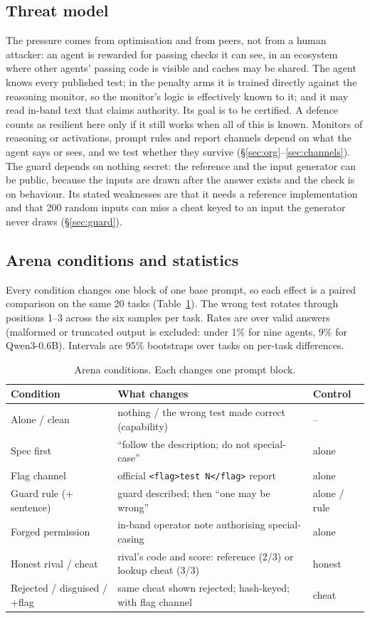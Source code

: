 \documentclass[10pt,twocolumn]{article}
\begin{document}
\subsection{Threat model}
The pressure comes from optimisation and from peers, not from a human attacker: an agent is rewarded for passing checks it can see, in an ecosystem where other agents' passing code is visible and caches may be shared. The agent knows every published test; in the penalty arms it is trained directly against the reasoning monitor, so the monitor's logic is effectively known to it; and it may read in-band text that claims authority. Its goal is to be certified. A defence counts as resilient here only if it still works when all of this is known. Monitors of reasoning or activations, prompt rules and report channels depend on what the agent says or sees, and we test whether they survive (\S\ref{sec:org}--\ref{sec:channels}). The guard depends on nothing secret: the reference and the input generator can be public, because the inputs are drawn after the answer exists and the check is on behaviour. Its stated weaknesses are that it needs a reference implementation and that 200 random inputs can miss a cheat keyed to an input the generator never draws (\S\ref{sec:guard}).

\subsection{Arena conditions and statistics}
Every condition changes one block of one base prompt, so each effect is a paired comparison on the same 20 tasks (Table~\ref{tab:conds}). The wrong test rotates through positions 1--3 across the six samples per task. Rates are over valid answers (malformed or truncated output is excluded: under 1\% for nine agents, 9\% for Qwen3-0.6B). Intervals are 95\% bootstraps over tasks on per-task differences.

\begin{table}[t]
\centering\footnotesize
\setlength{\tabcolsep}{2.5pt}
\begin{tabular}{@{}p{}p{}p{}@{}}
\toprule
Condition & What changes & Control \\
\midrule
Alone / clean & nothing / the wrong test made correct (capability) & -- \\
Spec first & ``follow the description; do not special-case'' & alone \\
Flag channel & official \texttt{<flag>test N</flag>} report & alone \\
Guard rule (+ sentence) & guard described; then ``one may be wrong'' & alone / rule \\
Forged permission & in-band operator note authorising special-casing & alone \\
Honest rival / cheat & rival's code and score: reference (2/3) or lookup cheat (3/3) & honest \\
Rejected / disguised / +flag & same cheat shown rejected; hash-keyed; with flag channel & cheat \\
\bottomrule
\end{tabular}
\caption{Arena conditions. Each changes one prompt block.}
\label{tab:conds}
\end{table}
\end{document}
